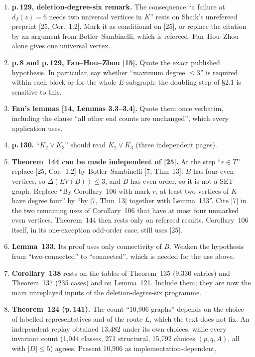 \documentclass[11pt]{amsart}
\begin{document}
\begin{enumerate}
$B-v$ is connected and $z$ keeps a neighbour since $|S|\ge2$; and $J-z=B$.
\item \textbf{p.\,129, deletion-degree-six remark.} The consequence ``a failure at $d_J(z)=6$ needs two
universal vertices in $K$'' rests on Shaik's unrefereed preprint [25, Cor.~1.2]. Mark it as
conditional on [25], or replace the citation by an argument from Botler--Sambinelli, which is
refereed. Fan--Hou--Zhou alone gives one universal vertex.
\item \textbf{p.\,8 and p.\,129, Fan--Hou--Zhou [15].} Quote the exact published hypothesis. In
particular, say whether ``maximum degree $\le3$'' is required within each block or for the whole
$E$-subgraph; the doubling step of \S2.1 is sensitive to this.
\item \textbf{Fan's lemmas [14, Lemmas 3.3--3.4].} Quote them once verbatim, including the clause
``all other end counts are unchanged'', which every application uses.
\item \textbf{p.\,130.} ``$K_2\vee K_3$'' should read $K_2\vee\overline{K_3}$ (three independent pages).
\item \textbf{Theorem~144 can be made independent of [25].} At the step ``$r\in T$'' replace
[25, Cor.~1.2] by Botler--Sambinelli [7, Thm~13]: $B$ has four even vertices, so $\Delta(EV(B))\le3$, and
$B$ has even order, so it is not a SET graph. Replace ``By Corollary~106 with mark $r$, at least two
vertices of $K$ have degree four'' by ``by [7, Thm~13] together with Lemma~133''. Cite [7] in the two
remaining uses of Corollary~106 that have at most four unmarked even vertices. Theorem~144 then rests
only on refereed results. Corollary~106 itself, in its one-exception odd-order case, still uses [25].
\item \textbf{Lemma~133.} Its proof uses only connectivity of $B$. Weaken the hypothesis from
``two-connected'' to ``connected'', which is needed for the use above.
\item \textbf{Corollary~138} rests on the tables of Theorem~135 (9{,}330 entries) and Theorem~137 (235
cases) and on Lemma~121. Include them; they are now the main unreplayed inputs of the deletion-degree-six
programme.
\item \textbf{Theorem~124 (p.\,141).} The count ``10{,}906 graphs'' depends on the choice of labelled
representatives and of the route $L$, which the text does not fix. An independent replay obtained
13{,}482 under its own choices, while every invariant count (1{,}044 classes, 271 structural,
15{,}792 choices $(p,q,A)$, all with $|D|\le5$) agrees. Present 10{,}906 as implementation-dependent,

\end{enumerate}
\end{document}

